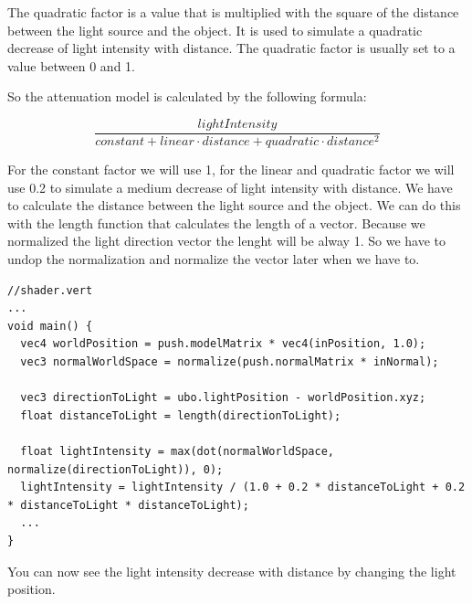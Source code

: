 \documentclass[12pt]{report} \usepackage{preamble}
\begin{document}
The quadratic factor is a value that is multiplied with the square of the distance between the light source and the object.
It is used to simulate a quadratic decrease of light intensity with distance. The quadratic factor is usually set to a value between 0 and 1.

So the attenuation model is calculated by the following formula:

\[
	\frac{lightIntensity}{constant + linear \cdot distance + quadratic \cdot distance^2}
\]

For the constant factor we will use 1, for the linear and quadratic factor we will use 0.2 to simulate a medium decrease of light intensity with distance.
We have to calculate the distance between the light source and the object. We can do this with the length function that calculates the length of a vector.
Because we normalized the light direction vector the lenght will be alway 1. So we have to undop the normalization and normalize the vector later when we have to.

\begin{lstlisting}[Language=C++]
//shader.vert
...
void main() {
  vec4 worldPosition = push.modelMatrix * vec4(inPosition, 1.0);
  vec3 normalWorldSpace = normalize(push.normalMatrix * inNormal);

  vec3 directionToLight = ubo.lightPosition - worldPosition.xyz;
  float distanceToLight = length(directionToLight);

  float lightIntensity = max(dot(normalWorldSpace, normalize(directionToLight)), 0);
  lightIntensity = lightIntensity / (1.0 + 0.2 * distanceToLight + 0.2 * distanceToLight * distanceToLight);
  ...
}
\end{lstlisting}

You can now see the light intensity decrease with distance by changing the light position.

\listoffigures

\printbibliography[
	heading=bibintoc, title={Bibliography}
]
\end{document}
